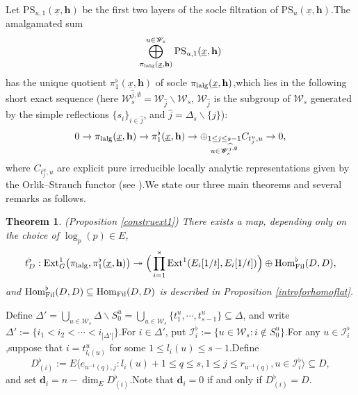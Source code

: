 \documentclass[10pt]{article}
\newtheorem{thm}{Theorem}[section]
\newcommand{\fil}{{\rm Fil}}
\newcommand{\homo}{{\rm Hom}}
\newcommand{\ext}{{\rm Ext}}
\newcommand{\lalg}{{\rm lalg}}
\newcommand{\bh}{{\mathbf{h}}}
\newcommand{\bd}{{\mathbf{d}}}
\newcommand{\cI}{\mathcal I}
\newcommand{\sW}{\mathscr W}
\begin{document}
Let $\mathrm{PS}_{u,1}(\underline{x},\bh)$ be the first two layers of the socle filtration of $\mathrm{PS}_u(\underline{x},\bh)$.\;The amalgamated sum 
\[\bigoplus^{u\in \sW_{s}}_{\pi_{\lalg}(\underline{x},\bh)}\mathrm{PS}_{u,1}(\underline{x},\bh)\]
 has the unique quotient $\pi^{\flat}_{1}(\underline{x},\bh)$ of socle $\pi_{\lalg}(\underline{x},\bh)$,\;which lies in the following short exact sequence (here $\sW_{s}^{\widehat{j},\emptyset}=\sW_{\widehat{j}}\backslash\sW_s$, $\sW_{\widehat{j}}$ is the subgroup of $\sW_s$ generated by the simple reflections $\{s_i\}_{i\in \widehat{j}}$, and $\widehat{j}=\Delta_s\backslash \{j\}$):
\begin{equation}\label{firstwholeintro}
	0\rightarrow \pi_{\lalg}(\underline{x},\bh) \rightarrow \pi^{\flat}_{1}(\underline{x},\bh)\rightarrow \oplus_{\substack{1\leq j\leq s-1\\u\in \sW_{s}^{\widehat{j},\emptyset}}}C_{t_j^u,u}\rightarrow 0,
\end{equation}
where $C_{t_j^u,u}$ are explicit pure irreducible locally analytic representations given by the Orlik--Strauch functor (see \cite[The main theorem]{orlik2015jordan}).\;We state our three main theorems and several remarks as follows.\;



\begin{thm}\label{thmintor1}(Proposition \ref{construext1}) There exists a map, depending only on the choice of $\log_p(p)\in E$,
	\begin{equation}\label{reconsfortDpikcirc}
{t}^{\flat}_{D}:\ext^1_{G}\big(\pi_{\lalg},\pi^{\flat}_{1}(\underline{x},\bh)\big)\twoheadrightarrow
		\Big(\prod_{i=1}^s\ext^{1}(E_i[1/t],E_i[1/t])\Big)\oplus\homo^{\flat}_{\fil}(D,D),
	\end{equation}
and $\homo^{\flat}_{\fil}(D,D)\subseteq \homo_{\fil}(D,D)$ is described in Proposition \ref{introforhomoflat}.\;
\end{thm}

Define $\Delta'=\bigcup_{u\in \sW_s}\Delta\backslash S_0^u=\bigcup_{u\in \sW_s}\{t_1^u,\cdots,t_{s-1}^u\}\subseteq\Delta$, and write $\Delta':=\{i_{1}<i_{2}<\cdots<i_{|\Delta'|}\}$.\;For $i\in\Delta'$, put $\cI_{i}^{\flat}:=\{u\in \sW_s:i\notin S^u_0 \}$.\;For any $u\in \cI_{i}^{\flat}$,\;suppose that $i=t^u_{l_i(u)}$ for some $1\leq l_i(u)\leq s-1$.\;Define
\[D^{\flat}_{(i)}:=E\langle e_{u^{-1}(q),j}:l_i(u)+1\leq q\leq s,1\leq j\leq r_{u^{-1}(q)},u\in \cI_{i}^{\flat}\rangle\subseteq D,\]
and set $\bd_i=n-\dim_ED^{\flat}_{(i)}$.\;Note that $\bd_i=0$ if and only if $D^{\flat}_{(i)}=D$.\;
\end{document}
